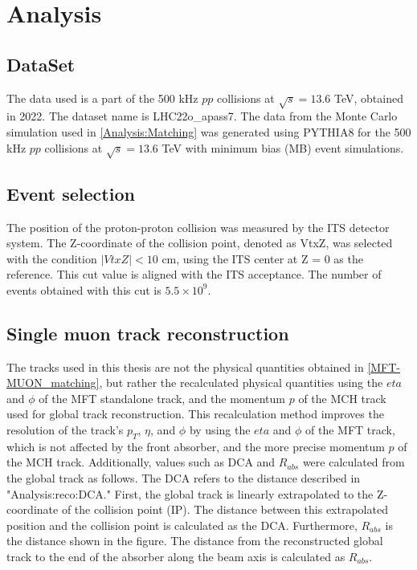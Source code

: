 \newpage
\clearpage
\section{Analysis}
\label{Analysis}
    \subsection{DataSet}
    \label{DataSet}
        The data used is a part of the 500 kHz $pp$ collisions at $\sqrt{s}=13.6$ TeV, obtained in 2022. The dataset name is LHC22o\_apass7. The data from the Monte Carlo simulation used in \ref{Analysis:Matching} was generated using PYTHIA8 for the 500 kHz $pp$ collisions at $\sqrt{s}=13.6$ TeV with minimum bias (MB) event simulations.
        
    \subsection{Event selection}
    \label{Event_selection}
        The position of the proton-proton collision was measured by the ITS detector system. The Z-coordinate of the collision point, denoted as VtxZ, was selected with the condition $|VtxZ| < 10$ cm, using the ITS center at Z = 0 as the reference. This cut value is aligned with the ITS acceptance. The number of events obtained with this cut is $5.5 \times 10^9$.

    \subsection{Single muon track reconstruction}
    \label{Single_reco}
        The tracks used in this thesis are not the physical quantities obtained in \ref{MFT-MUON_matching}, but rather the recalculated physical quantities using the $eta$ and $\phi$ of the MFT standalone track, and the momentum $p$ of the MCH track used for global track reconstruction. This recalculation method improves the resolution of the track's $p_T$, $\eta$, and $\phi$ by using the $eta$ and $\phi$ of the MFT track, which is not affected by the front absorber, and the more precise momentum $p$ of the MCH track. Additionally, values such as DCA and $R_{abs}$ were calculated from the global track as follows. The DCA refers to the distance described in "Analysis:reco:DCA." First, the global track is linearly extrapolated to the Z-coordinate of the collision point (IP). The distance between this extrapolated position and the collision point is calculated as the DCA. Furthermore, $R_{abs}$ is the distance shown in the figure. The distance from the reconstructed global track to the end of the absorber along the beam axis is calculated as $R_{abs}$.

